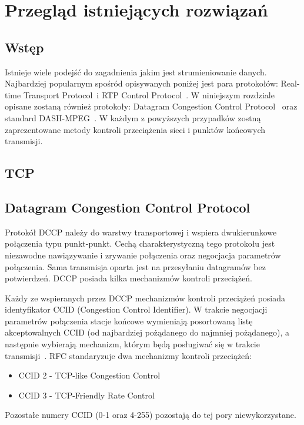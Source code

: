 \chapter{Przegląd istniejących rozwiązań}
\label{cha:rozdzial3}

\section{Wstęp}

Istnieje wiele podejść do zagadnienia jakim jest strumieniowanie danych. Najbardziej popularnym spośród opisywanych poniżej jest para protokołów: Real-time Transport Protocol~i RTP Control Protocol~\cite{RFC3550}. W niniejszym rozdziale opisane zostaną również protokoły: Datagram Congestion Control Protocol~\cite{RFC4340} oraz standard DASH-MPEG~\cite{ISO-IEC-DASH}. W każdym z powyższych przypadków zostną zaprezentowane metody kontroli przeciążenia sieci i punktów końcowych transmisji.

\section{TCP}

\section{Datagram Congestion Control Protocol}

Protokół DCCP należy do warstwy transportowej i wspiera dwukierunkowe połączenia typu punkt-punkt. Cechą charakterystyczną tego protokołu jest niezawodne nawiązywanie i zrywanie połączenia oraz negocjacja parametrów połączenia. Sama transmisja oparta jest na przesyłaniu datagramów bez potwierdzeń. DCCP posiada kilka mechanizmów kontroli przeciążeń.

Każdy ze wspieranych przez DCCP mechanizmów kontroli przeciążeń posiada identyfikator CCID (Congestion Control Identifier). W trakcie negocjacji parametrów połączenia stacje końcowe wymieniają posortowaną listę akceptowalnych CCID (od najbardziej pożądanego do najmniej pożądanego), a następnie wybierają mechanizm, którym będą posługiwać się w trakcie transmisji~\cite{RFC5762}. RFC standaryzuje dwa mechanizmy kontroli przeciążeń:
\begin{itemize}
  \item CCID 2 - TCP-like Congestion Control
  \item CCID 3 - TCP-Friendly Rate Control
\end{itemize}
Pozostałe numery CCID (0-1 oraz 4-255) pozostają do tej pory niewykorzystane.

